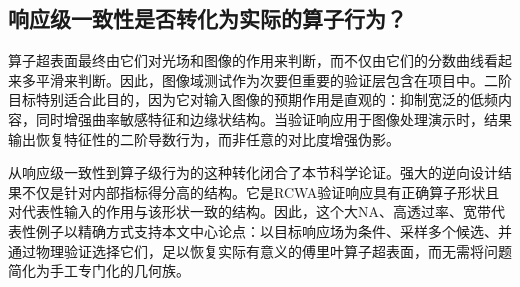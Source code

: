 \subsection{响应级一致性是否转化为实际的算子行为？}

算子超表面最终由它们对光场和图像的作用来判断，而不仅由它们的分数曲线看起来多平滑来判断。因此，图像域测试作为次要但重要的验证层包含在项目中。二阶目标特别适合此目的，因为它对输入图像的预期作用是直观的：抑制宽泛的低频内容，同时增强曲率敏感特征和边缘状结构。当验证响应用于图像处理演示时，结果输出恢复特征性的二阶导数行为，而非任意的对比度增强伪影。

从响应级一致性到算子级行为的这种转化闭合了本节科学论证。强大的逆向设计结果不仅是针对内部指标得分高的结构。它是RCWA验证响应具有正确算子形状且对代表性输入的作用与该形状一致的结构。因此，这个大NA、高透过率、宽带代表性例子以精确方式支持本文中心论点：以目标响应场为条件、采样多个候选、并通过物理验证选择它们，足以恢复实际有意义的傅里叶算子超表面，而无需将问题简化为手工专门化的几何族。
